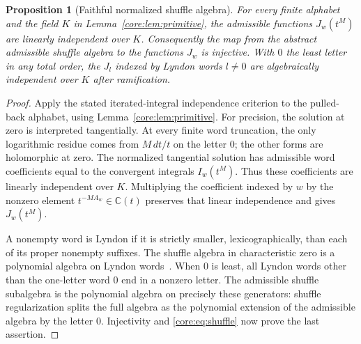 \documentclass[11pt,a4paper]{article}
\newtheorem{proposition}[theorem]{Proposition}
\theoremstyle{definition}
\theoremstyle{remark}
\numberwithin{equation}{section}
\begin{document}
\begin{proposition}[Faithful normalized shuffle algebra]\label{core:prop:functional}
For every finite alphabet and the field $K$ in
Lemma~\ref{core:lem:primitive}, the admissible functions $J_w(t^M)$ are
linearly independent over $K$. Consequently the map from the abstract
admissible shuffle algebra to the functions $J_w$ is injective.
With $0$ the least letter in any total order, the $J_l$ indexed by
Lyndon words $l\ne0$ are algebraically independent over $K$ after
ramification.
\end{proposition}
\begin{proof}
Apply the stated iterated-integral independence criterion to the
pulled-back alphabet, using Lemma~\ref{core:lem:primitive}. For precision,
the solution at zero is interpreted tangentially. At every finite
word truncation, the only logarithmic residue comes from $M\,dt/t$
on the letter $0$; the other forms are holomorphic at zero. The
normalized tangential solution has admissible word coefficients equal
to the convergent integrals $I_w(t^M)$. Thus these coefficients are
linearly independent over $K$. Multiplying the coefficient indexed by
$w$ by the nonzero element $t^{-MA_w}\in\mathbb C(t)$ preserves that
linear independence and gives $J_w(t^M)$.

A nonempty word is Lyndon if it is strictly smaller, lexicographically,
than each of its proper nonempty suffixes. The shuffle algebra in
characteristic zero is a polynomial algebra on Lyndon words~\cite{Radford}. When $0$ is least, all Lyndon words other than the
one-letter word $0$ end in a nonzero letter. The admissible shuffle
subalgebra is the polynomial algebra on precisely these generators:
shuffle regularization splits the full algebra as the polynomial
extension of the admissible algebra by the letter $0$.
Injectivity and \eqref{core:eq:shuffle} now prove the last assertion.
\end{proof}
\end{document}
